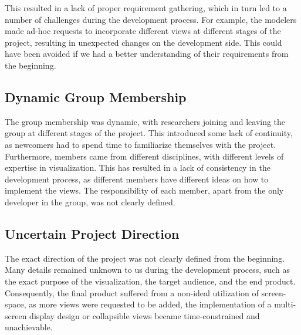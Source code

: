 This resulted in a lack of proper requirement gathering, which in turn led to a number of challenges during the development process.
For example, the modelers made ad-hoc requests to incorporate different views at different stages of the project, resulting in unexpected changes on the development side.
This could have been avoided if we had a better understanding of their requirements from the beginning.

\subsection{Dynamic Group Membership}

The group membership was dynamic, with researchers joining and leaving the group at different stages of the project.
This introduced some lack of continuity, as newcomers had to spend time to familiarize themselves with the project.
Furthermore, members came from different disciplines, with different levels of expertise in visualization.
This has resulted in a lack of consistency in the development process, as different members have different ideas on how to implement the views.
The responsibility of each member, apart from the only developer in the group, was not clearly defined.

\subsection{Uncertain Project Direction}

The exact direction of the project was not clearly defined from the beginning.
Many details remained unknown to us during the development process, such as the exact purpose of the visualization, the target audience, and the end product. 
Consequently, the final product suffered from a non-ideal utilization of screen-space, as more views were requested to be added, the implementation of a multi-screen display design or collapsible views became time-constrained and unachievable.
